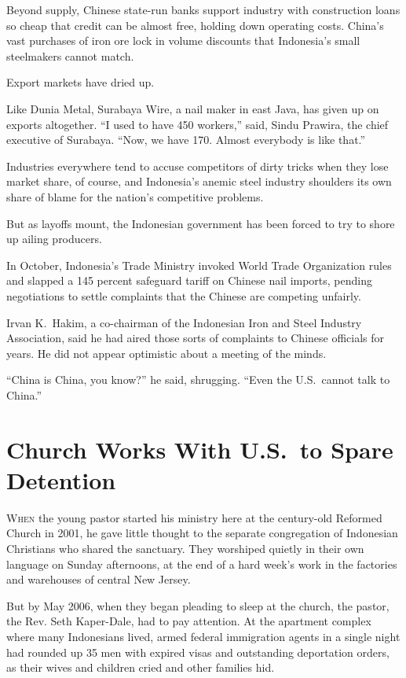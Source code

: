 ﻿\documentclass[12pt]{article}
\begin{document}
Beyond supply, Chinese state-run banks support industry with construction loans so cheap that credit
can be almost free, holding down operating costs. China's vast purchases of iron ore lock in volume
discounts that Indonesia's small steelmakers cannot match.

Export markets have dried up.

Like Dunia Metal, Surabaya Wire, a nail maker in east Java, has given up on exports altogether. ``I
used to have 450 workers,'' said, Sindu Prawira, the chief executive of Surabaya. ``Now, we have
170. Almost everybody is like that.''

Industries everywhere tend to accuse competitors of dirty tricks when they lose market share, of
course, and Indonesia's anemic steel industry shoulders its own share of blame for the nation's
competitive problems.

But as layoffs mount, the Indonesian government has been forced to try to shore up ailing producers.

In October, Indonesia's Trade Ministry invoked World Trade Organization rules and slapped a 145
percent safeguard tariff on Chinese nail imports, pending negotiations to settle complaints that the
Chinese are competing unfairly.

Irvan K.~Hakim, a co-chairman of the Indonesian Iron and Steel Industry Association, said he had
aired those sorts of complaints to Chinese officials for years. He did not appear optimistic about a
meeting of the minds.

``China is China, you know?'' he said, shrugging. ``Even the U.S.~cannot talk to China.''

\section{Church Works With U.S.~to Spare Detention}

\lettrine{W}{hen} the young pastor started his ministry here at the
century-old Reformed Church in 2001, he gave little thought to the separate congregation of
Indonesian Christians who shared the sanctuary. They worshiped quietly in their own language on
Sunday afternoons, at the end of a hard week's work in the factories and warehouses of central New
Jersey.

But by May 2006, when they began pleading to sleep at the church, the pastor, the Rev. Seth
Kaper-Dale, had to pay attention. At the apartment complex where many Indonesians lived, armed
federal immigration agents in a single night had rounded up 35 men with expired visas and
outstanding deportation orders, as their wives and children cried and other families hid.
\end{document}
